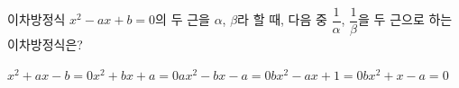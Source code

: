 이차방정식 $x^2-ax+b=0$의 두 근을 $\alpha$, $\beta$라 할 때, 다음 중 $\dfrac{1}{\alpha}$, $\dfrac{1}{\beta}$을 두 근으로 하는 이차방정식은? 
\begin{choicesii}{$x^2+ax-b=0$}{$x^2+bx+a=0$}{$ax^2-bx-a=0$}{$bx^2-ax+1=0$}{$bx^2+x-a=0$}\end{choicesii}
